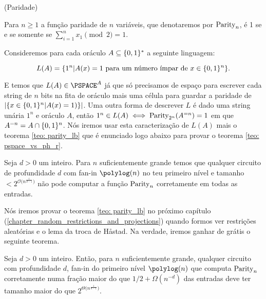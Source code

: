 \begin{defi} (Paridade) \label{parity}

Para $n \geq 1$ a função paridade de $n$ variáveis, que denotaremos por $\text{Parity}_{n}$, é 1 se e se somente se $\sum_{i = 1}^{n} x_{1} \pmod{2} = 1$.

\end{defi}

Consideremos para cada oráculo $A \subseteq \{0, 1\}^{*}$ a seguinte linguagem:

\begin{equation*}
    L(A) = \{1^{n} \lvert A(x) = 1 \text{ para um número ímpar de } x \in \{0, 1\}^{n}\}.
\end{equation*}

E temos que $L(A) \in \PSPACE^{A}$ já que só precisamos de espaço para escrever cada string de $n$ bits na fita de oráculo mais uma célula para guardar a paridade de $\lvert \{x \in \{0, 1\}^{n} \lvert A(x) = 1)\} \rvert$. Uma outra forma de descrever $L$ é dado uma string unária $1^{n}$ e oráculo $A$, então $1^{n} \in L(A) \iff \text{Parity}_{2^{n}}(A^{= n}) = 1$ em que $A^{=n} = A \cap \{0, 1\}^{n}$. Nós iremos usar esta caracterização de $L(A)$ mais o teorema \ref{teo: parity_lb} que é enunciado logo abaixo para provar o teorema \ref{teo: pspace_vs_ph_r}.

\begin{teo} \label{teo: parity_lb}

Seja $d > 0$ um inteiro. Para $n$ suficientemente grande temos que qualquer circuito de profundidade $d$ com fan-in $\polylog(n)$ no teu primeiro nível e tamanho $< 2^{\mathcal{O}\big(n^{\frac{1}{d - 1}}\big)}$ não pode computar a função $\text{Parity}_{n}$ corretamente em todas as entradas. 

\end{teo}

Nós iremos provar o teorema \ref{teo: parity_lb} no próximo capítulo (\ref{chapter_random_restrictions_and_projections}) quando formos ver restrições aleatórias e o lema da troca de H{\aa}stad. Na verdade, iremos ganhar de grátis o seguinte teorema.

\begin{teo} \label{teo: parity_lb_app}

Seja $d > 0$ um inteiro. Então, para $n$ suficientemente grande, qualquer circuito com profundidade $d$, fan-in do primeiro nível $\polylog(n)$ que computa $\text{Parity}_{n}$ corretamente numa fração maior do que $1/2 + \Omega(n^{-d})$ das entradas deve ter tamanho maior do que $2^{\Theta\big(n^{\frac{1}{d - 1}}\big)}$.

\end{teo}

